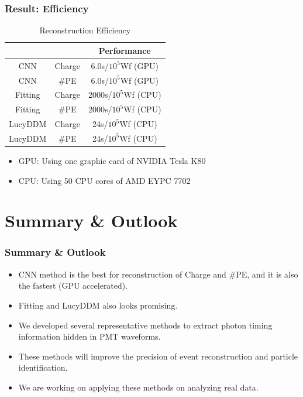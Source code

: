 \documentclass{beamer}
\begin{document}
\begin{frame}
\frametitle{Result: Efficiency}
\begin{table}
    \centering
    \caption{Reconstruction Efficiency}
    \begin{tabular}{c|c|c}
        \hline
        &  & Performance \\
        \hline
        CNN & Charge & 6.0s/$10^{5}$Wf (GPU) \\
        \hline
        CNN & \#PE & 6.0s/$10^{5}$Wf (GPU)\\
        \hline
        Fitting & Charge & 2000s/$10^{5}$Wf (CPU) \\
        \hline
        Fitting & \#PE & 2000s/$10^{5}$Wf (CPU) \\
        \hline
        LucyDDM & Charge & 24s/$10^{5}$Wf (CPU) \\
        \hline
        LucyDDM & \#PE & 24s/$10^{5}$Wf (CPU) \\
        \hline
    \end{tabular}
\end{table}
\hspace{4mm}\begin{itemize}
    \item GPU: Using one graphic card of NVIDIA Tesla K80
    \item CPU: Using 50 CPU cores of AMD EYPC 7702
\end{itemize}
\end{frame}

\section{Summary \& Outlook}
\begin{frame}
\frametitle{Summary \& Outlook}
\begin{itemize}
    \item CNN method is the best for reconstruction of Charge and \#PE, and it is also the fastest (GPU accelerated).
    \item Fitting and LucyDDM also looks promising.  
    \item We developed several representative methods to extract photon timing information hidden in PMT waveforms. 
    \item These methods will improve the precision of event reconstruction and particle identification. 
    \item We are working on applying these methods on analyzing real data. 
\end{itemize}
\end{frame}
\end{document}
